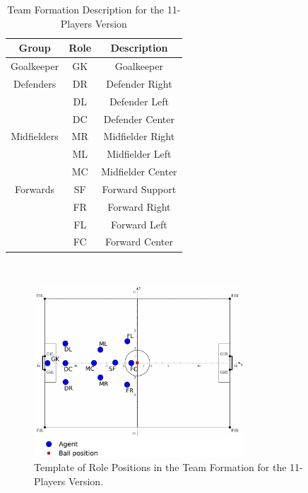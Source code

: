 \begin{table}[t!]
\vspace*{-0.5cm}
\caption{Team Formation Description for the 11-Players Version}
\label{TeamFormation11}
\begin{center}
    \begin{tabular}{ccc}
    \textbf{Group} 	& \textbf{Role} & \textbf{Description}  \\
    \midrule
	Goalkeeper 		     & GK		& Goalkeeper  \\ 
    Defenders			& DR		& Defender Right			\\
     						& DL		& Defender Left		 	\\
    						& DC		& Defender Center			\\
    Midfielders			    & MR		& Midfielder Right			\\
     						& ML		& Midfielder Left			\\
     						& MC		& Midfielder Center			\\
    Forwards 	  	  	& SF		& Forward Support         \\
     						& FR		& Forward Right		 	\\
     					& FL		& Forward Left		 	\\
     					& FC   	    & Forward Center		 
    \end{tabular}
\end{center}
\vspace*{-0.9cm}
\end{table}
~
\begin{figure}[t!]
\centering
  \includegraphics[width=0.7\textwidth]{Chapter4/figures/Formation11_0.pdf}
  \caption{Template of Role Positions in the Team Formation for the 11-Players Version.} 
  \label{fig:Formation11_0}
\end{figure}


